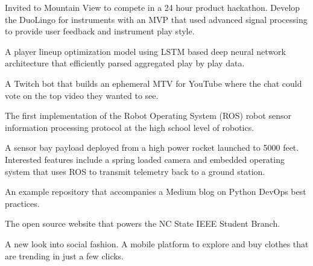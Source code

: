 {%
	Invited to Mountain View to compete in a 24 hour product hackathon. Develop the DuoLingo for instruments with an MVP that used advanced signal processing to provide user feedback and instrument play style.
}

\vspace{0.5em}

{%
	A player lineup optimization model using LSTM based deep neural network architecture that efficiently parsed aggregated play by play data.
}

\vspace{0.5em}

{%
	A Twitch bot that builds an ephemeral MTV for YouTube where the chat could vote on the top video they wanted to see.
}

\vspace{0.5em}

{%
	The first implementation of the Robot Operating System (ROS) robot sensor information processing protocol at the high school level of robotics.
}

\vspace{0.5em}

{%
	A sensor bay payload deployed from a high power rocket launched to 5000 feet. Interested features include a spring loaded camera and embedded operating system that uses ROS to transmit telemetry back to a ground station.
}

\vspace{0.5em}

{%
	An example repository that accompanies a Medium blog on Python DevOps best practices.
}

\vspace{0.5em}

{%
	The open source website that powers the NC State IEEE Student Branch.
}

\vspace{0.5em}

{%
	A new look into social fashion. A mobile platform to explore and buy clothes that are trending in just a few clicks.
}